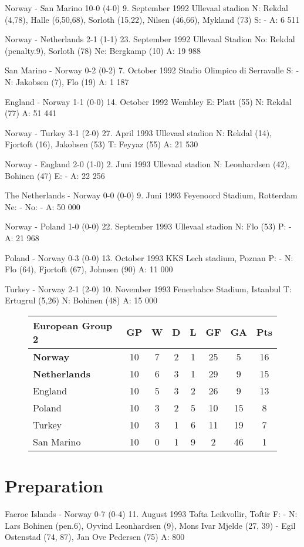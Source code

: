 Norway - San Marino 10-0 (4-0)
9. September 1992
Ullevaal stadion
N: Rekdal (4,78), Halle (6,50,68), Sorloth (15,22), Nilsen (46,66), Mykland (73)
S: -
A: 6 511

Norway - Netherlands 2-1 (1-1)
23. September 1992
Ullevaal Stadion
No: Rekdal (penalty.9), Sorloth (78)
Ne: Bergkamp (10)
A: 19 988

San Marino - Norway 0-2 (0-2)
7. October 1992
Stadio Olimpico di Serravalle
S: -
N: Jakobsen (7), Flo (19)
A: 1 187

England - Norway 1-1 (0-0)
14. October 1992
Wembley
E: Platt (55)
N: Rekdal (77)
A: 51 441

Norway - Turkey 3-1 (2-0)
27. April 1993
Ullevaal stadion
N: Rekdal (14), Fjortoft (16), Jakobsen (53)
T: Feyyaz (55)
A: 21 530

Norway - England 2-0 (1-0)
2. Juni 1993
Ullevaal stadion
N: Leonhardsen (42), Bohinen (47)
E: -
A: 22 256

The Netherlands - Norway 0-0 (0-0)
9. Juni 1993
Feyenoord Stadium, Rotterdam
Ne: -
No: -
A: 50 000

Norway - Poland 1-0 (0-0)
22. September 1993
Ullevaal stadion
N: Flo (53)
P: -
A: 21 968

Poland - Norway 0-3 (0-0)
13. October 1993
KKS Lech stadium, Poznan
P: -
N: Flo (64), Fjortoft (67), Johnsen (90)
A: 11 000

Turkey - Norway 2-1 (2-0)
10. November 1993
Fenerbahce Stadium, Istanbul
T: Ertugrul (5,26)
N: Bohinen (48)
A: 15 000
\begin{figure}[H]
\begin{tabular}{l c c c c c c c}
European Group 2 & GP & W & D & L & GF & GA & Pts \\ \hline
\textbf{Norway} & 10 & 7 & 2 & 1 & 25 & 5 & 16 \\
\textbf{Netherlands} & 10 & 6 & 3 & 1 & 29 & 9 & 15 \\
England & 10 & 5 & 3 & 2 & 26 & 9 & 13 \\
Poland & 10 & 3 & 2 & 5 & 10 & 15 & 8 \\
Turkey & 10 & 3 & 1 & 6 & 11 & 19 & 7 \\
San Marino & 10 & 0 & 1 & 9 & 2 & 46 & 1 \\ \hline
\end{tabular}
\end{figure}
\section{Preparation}
Faeroe Islands - Norway 0-7 (0-4)
11. August 1993
Tofta Leikvollir, Toftir
F: -
N: Lars Bohinen (pen.6), Oyvind Leonhardsen (9), Mons Ivar Mjelde (27, 39) -
   Egil Ostenstad (74, 87), Jan Ove Pedersen (75)
A: 800

